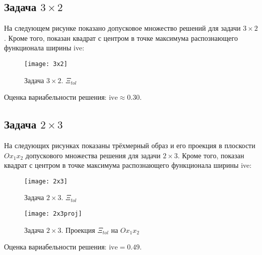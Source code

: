 \subsection{Задача $3 \times 2$}

На следующем рисунке показано допусковое множество решений для задачи $3 \times 2$. Кроме того, показан квадрат с центром в точке максимума распознающего функционала ширины ive:

\begin{figure}[H]
	\begin{center}
		\texttt{[image: 3x2]}
		\label{pic:32tol}
		\caption{Задача $3 \times 2$. $\Xi_{tol}$}
	\end{center}
\end{figure}

Оценка вариабельности решения: $\textrm{ive} \approx 0.30$.

\subsection{Задача $2 \times 3$}
На следующих рисунках показаны трёхмерный образ и его проекция в плоскости $Ox_1x_2$ допускового множества решения для задачи $2 \times 3$. Кроме того, показан квадрат с центром в точке максимума распознающего функционала ширины ive:

\begin{figure}[H]
	\begin{center}
		\texttt{[image: 2x3]}
		\label{pic:23tol}
		\caption{Задача $2 \times 3$. $\Xi_{tol}$}
	\end{center}
\end{figure}

\begin{figure}[H]
	\begin{center}
		\texttt{[image: 2x3proj]}
		\label{pic:23projtol}
		\caption{Задача $2 \times 3$. Проекция $\Xi_{tol}$ на $Ox_1x_2$}
	\end{center}
\end{figure}

Оценка вариабельности решения: $\textrm{ive} = 0.49$.